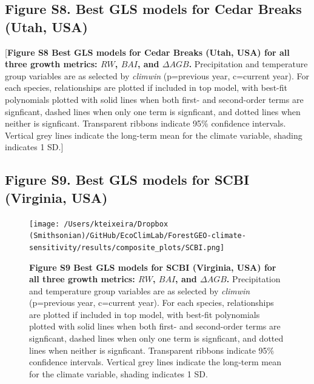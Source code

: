 \documentclass[
]{article}
\begin{document}
\newpage

\hypertarget{figure-s8.-best-gls-models-for-cedar-breaks-utah-usa}{%
\subsection{Figure S8. Best GLS models for Cedar Breaks (Utah,
USA)}\label{figure-s8.-best-gls-models-for-cedar-breaks-utah-usa}}

{[}\textbf{Figure S8 \textbar{} Best GLS models for Cedar Breaks (Utah,
USA) for all three growth metrics: \(RW\), \(BAI\), and \(\Delta AGB\).}
Precipitation and temperature group variables are as selected by
\emph{climwin} (p=previous year, c=current year). For each species,
relationships are plotted if included in top model, with best-fit
polynomials plotted with solid lines when both first- and second-order
terms are signficant, dashed lines when only one term is signficant, and
dotted lines when neither is signficant. Transparent ribbons indicate
95\% confidence intervals. Vertical grey lines indicate the long-term
mean for the climate variable, shading indicates 1 SD.{]}

\newpage

\hypertarget{figure-s9.-best-gls-models-for-scbi-virginia-usa}{%
\subsection{Figure S9. Best GLS models for SCBI (Virginia,
USA)}\label{figure-s9.-best-gls-models-for-scbi-virginia-usa}}

\begin{figure}
\centering
\texttt{[image: /Users/kteixeira/Dropbox (Smithsonian)/GitHub/EcoClimLab/ForestGEO-climate-sensitivity/results/composite\_plots/SCBI.png]}
\caption{\textbf{Figure S9 \textbar{} Best GLS models for SCBI
(Virginia, USA) for all three growth metrics: \(RW\), \(BAI\), and
\(\Delta AGB\).} Precipitation and temperature group variables are as
selected by \emph{climwin} (p=previous year, c=current year). For each
species, relationships are plotted if included in top model, with
best-fit polynomials plotted with solid lines when both first- and
second-order terms are signficant, dashed lines when only one term is
signficant, and dotted lines when neither is signficant. Transparent
ribbons indicate 95\% confidence intervals. Vertical grey lines indicate
the long-term mean for the climate variable, shading indicates 1 SD.}
\end{figure}
\end{document}
